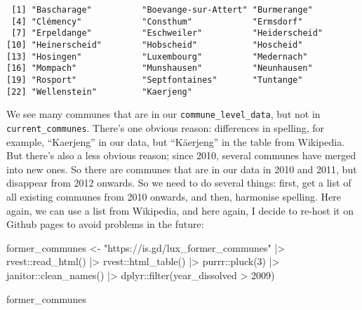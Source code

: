 \documentclass[
  letterpaper,
  DIV=11,
  numbers=noendperiod]{scrartcl}
\newenvironment{Shaded}{\begin{snugshade}}{\end{snugshade}}
\newcommand{\DecValTok}[1]{\textcolor[rgb]{0.68,0.00,0.00}{#1}}
\newcommand{\FunctionTok}[1]{\textcolor[rgb]{0.28,0.35,0.67}{#1}}
\newcommand{\NormalTok}[1]{\textcolor[rgb]{0.00,0.23,0.31}{#1}}
\newcommand{\OtherTok}[1]{\textcolor[rgb]{0.00,0.23,0.31}{#1}}
\newcommand{\SpecialCharTok}[1]{\textcolor[rgb]{0.37,0.37,0.37}{#1}}
\newcommand{\StringTok}[1]{\textcolor[rgb]{0.13,0.47,0.30}{#1}}
\begin{document}
\begin{verbatim}
 [1] "Bascharage"          "Boevange-sur-Attert" "Burmerange"         
 [4] "Clémency"            "Consthum"            "Ermsdorf"           
 [7] "Erpeldange"          "Eschweiler"          "Heiderscheid"       
[10] "Heinerscheid"        "Hobscheid"           "Hoscheid"           
[13] "Hosingen"            "Luxembourg"          "Medernach"          
[16] "Mompach"             "Munshausen"          "Neunhausen"         
[19] "Rosport"             "Septfontaines"       "Tuntange"           
[22] "Wellenstein"         "Kaerjeng"           
\end{verbatim}

We see many communes that are in our \texttt{commune\_level\_data}, but
not in \texttt{current\_communes}. There's one obvious reason:
differences in spelling, for example, ``Kaerjeng'' in our data, but
``Käerjeng'' in the table from Wikipedia. But there's also a less
obvious reason; since 2010, several communes have merged into new ones.
So there are communes that are in our data in 2010 and 2011, but
disappear from 2012 onwards. So we need to do several things: first, get
a list of all existing communes from 2010 onwards, and then, harmonise
spelling. Here again, we can use a list from Wikipedia, and here again,
I decide to re-host it on Github pages to avoid problems in the future:

\begin{Shaded}
\begin{Highlighting}[]
\NormalTok{former\_communes }\OtherTok{\textless{}{-}} \StringTok{"https://is.gd/lux\_former\_communes"} \SpecialCharTok{|\textgreater{}}
\NormalTok{  rvest}\SpecialCharTok{::}\FunctionTok{read\_html}\NormalTok{() }\SpecialCharTok{|\textgreater{}}
\NormalTok{  rvest}\SpecialCharTok{::}\FunctionTok{html\_table}\NormalTok{() }\SpecialCharTok{|\textgreater{}}
\NormalTok{  purrr}\SpecialCharTok{::}\FunctionTok{pluck}\NormalTok{(}\DecValTok{3}\NormalTok{) }\SpecialCharTok{|\textgreater{}}
\NormalTok{  janitor}\SpecialCharTok{::}\FunctionTok{clean\_names}\NormalTok{() }\SpecialCharTok{|\textgreater{}}
\NormalTok{  dplyr}\SpecialCharTok{::}\FunctionTok{filter}\NormalTok{(year\_dissolved }\SpecialCharTok{\textgreater{}} \DecValTok{2009}\NormalTok{)}

\NormalTok{former\_communes}
\end{Highlighting}
\end{Shaded}
\end{document}
